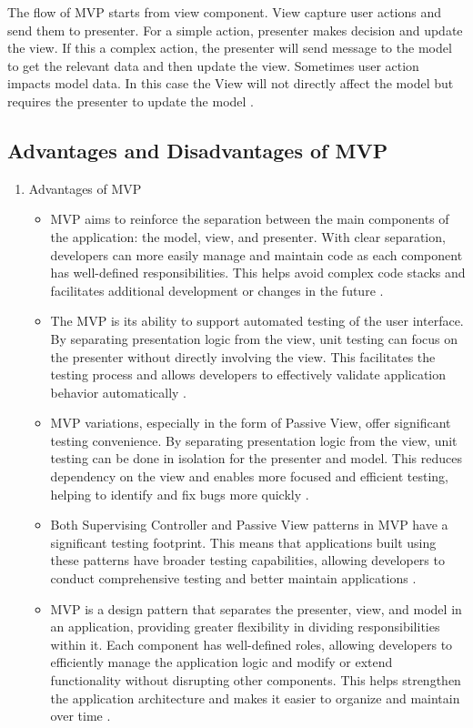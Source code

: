 \documentclass[conference]{IEEEtran}
\begin{document}
The flow of MVP starts from view component. View capture user actions and send them to presenter. For a simple action, presenter makes decision and update the view. If this a complex action, the presenter will send message to the model to get the relevant data and then update the view. Sometimes user action impacts model data. In this case the View will not directly affect the model but requires the presenter to update the model \cite{c5}. 

\subsection{Advantages and Disadvantages of MVP}
\begin{enumerate}
    \item Advantages of MVP
\begin{itemize}
    \item MVP aims to reinforce the separation between the main components of the application: the model, view, and presenter. With clear separation, developers can more easily manage and maintain code as each component has well-defined responsibilities. This helps avoid complex code stacks and facilitates additional development or changes in the future \cite{Lappalainen2017APL}.
    \item The MVP is its ability to support automated testing of the user interface. By separating presentation logic from the view, unit testing can focus on the presenter without directly involving the view. This facilitates the testing process and allows developers to effectively validate application behavior automatically \cite{Lappalainen2017APL}.
    \item MVP variations, especially in the form of Passive View, offer significant testing convenience. By separating presentation logic from the view, unit testing can be done in isolation for the presenter and model. This reduces dependency on the view and enables more focused and efficient testing, helping to identify and fix bugs more quickly \cite{Lappalainen2017APL}.
    \item Both Supervising Controller and Passive View patterns in MVP have a significant testing footprint. This means that applications built using these patterns have broader testing capabilities, allowing developers to conduct comprehensive testing and better maintain applications \cite{Lappalainen2017APL}.
    \item MVP is a design pattern that separates the presenter, view, and model in an application, providing greater flexibility in dividing responsibilities within it. Each component has well-defined roles, allowing developers to efficiently manage the application logic and modify or extend functionality without disrupting other components. This helps strengthen the application architecture and makes it easier to organize and maintain over time \cite{Lappalainen2017APL}.

\end{itemize}
\end{enumerate}
\end{document}
